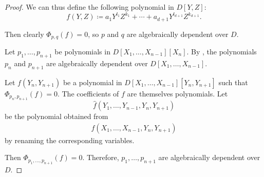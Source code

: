 \begin{proof}
  We can thus define the following polynomial in \( D[Y, Z] \):
  \begin{equation*}
    f(Y, Z) \coloneqq a_1 Y^{l_1} Z^{k_1} + \cdots + a_{d+1} Y^{l_{d+1}} Z^{k_{d+1}}.
  \end{equation*}

  Then clearly \( \Phi_{p,q}(f) = 0 \), so \( p \) and \( q \) are algebraically dependent over \( D \).

   Let \( p_1, \ldots, p_{n+1} \) be polynomials in \( D[X_1, \ldots, X_{n-1}][X_n] \). By , the polynomials \( p_n \) and \( p_{n+1} \) are algebraically dependent over \( D[X_1, \ldots, X_{n-1}] \).

  Let \( f(Y_n, Y_{n+1}) \) be a polynomial in \( D[X_1, \ldots, X_{n-1}][Y_n, Y_{n+1}] \) such that \( \Phi_{p_n,p_{n+1}}(f) = 0 \). The coefficients of \( f \) are themselves polynomials. Let
  \begin{equation*}
    \widehat{f}(Y_1, \ldots, Y_{n-1}, Y_n, Y_{n+1})
  \end{equation*}
  be the polynomial obtained from
  \begin{align*}
    f(X_1, \ldots, X_{n-1}, Y_n, Y_{n+1})
  \end{align*}
  by renaming the corresponding variables.

  Then \( \Phi_{p_1,\ldots,p_{n+1}}(f) = 0 \). Therefore, \( p_1, \ldots, p_{n+1} \) are algebraically dependent over \( D \).
\end{proof}

